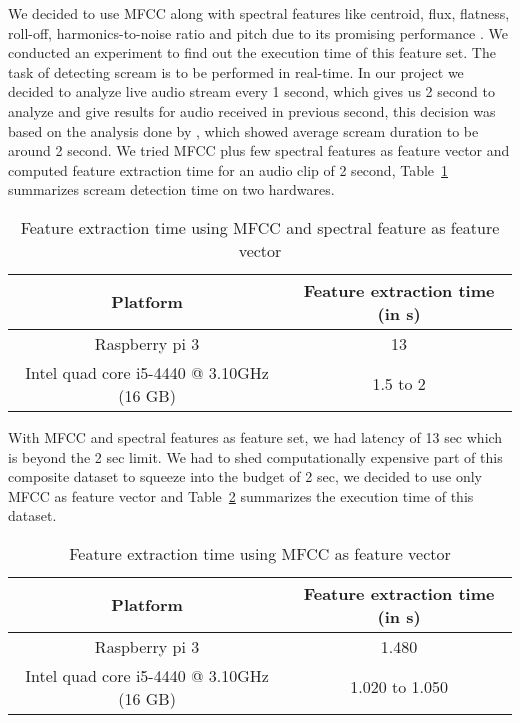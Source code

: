 We decided to use MFCC along with spectral features like centroid, flux, flatness, roll-off, harmonics-to-noise ratio and pitch due to its promising performance \cite{paper10}. We conducted an experiment to find out the execution time of this feature set. The task of detecting scream is to be performed in real-time. In our project we decided to analyze live audio stream every 1 second, which gives us 2 second to analyze and give results for audio received in previous second, this decision was based on the analysis done by \cite{paper10}, which showed average scream duration to be around 2 second. We tried MFCC plus few spectral features as feature vector and computed feature extraction time for an audio clip of 2 second, Table~\ref{tab:scr2} summarizes scream detection time on two hardwares.

\begin{table}[H]
\begin{center}
\begin{tabular}{ |c|c| } 
 \hline
 \textbf{Platform} & \textbf{Feature extraction time (in s)} \\
 \hline 
 \hline
 Raspberry pi 3 & 13 \\
 \hline
 Intel quad core i5-4440 @ 3.10GHz (16 GB) & 1.5 to 2 \\ 
 \hline
\end{tabular}
\end{center}
\caption{Feature extraction time using MFCC and spectral feature as feature vector} \label{tab:scr2}
\end{table}

With MFCC and spectral features as feature set, we had latency of 13 sec which is beyond the 2 sec limit. We had to shed computationally expensive part of this composite dataset to squeeze into the budget of 2 sec, we decided to use only MFCC as feature vector and Table~\ref{tab:scr1} summarizes the execution time of this dataset.

\begin{table}[H]
\begin{center}
\begin{tabular}{ |c|c| } 
 \hline
 \textbf{Platform} & \textbf{Feature extraction time (in s)} \\
 \hline 
 \hline
 Raspberry pi 3 & 1.480 \\
 \hline
 Intel quad core i5-4440 @ 3.10GHz (16 GB) & 1.020 to 1.050 \\ 
 \hline
\end{tabular}
\end{center}
\caption{Feature extraction time using MFCC as feature vector} \label{tab:scr1}
\end{table}

